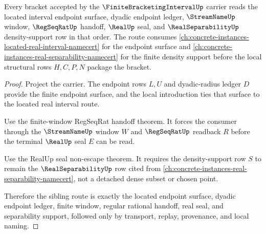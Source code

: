 \begin{theorem}
\label{thm:finite-bracketing-interval-sibling-route}
Every bracket accepted by the $\FiniteBracketingIntervalUp$ carrier reads the located interval endpoint surface, dyadic endpoint ledger, $\StreamNameUp$ window, $\RegSeqRatUp$ handoff, $\RealUp$ seal, and $\RealSeparabilityUp$ density-support row in that order. The route consumes \autoref{ch:concrete-instances-located-real-interval-namecert} for the endpoint surface and \autoref{ch:concrete-instances-real-separability-namecert} for the finite density support before the local structural rows $H,C,P,N$ package the bracket.
\end{theorem}
\begin{proof}
Project the carrier. The endpoint rows $L,U$ and dyadic-radius ledger $D$ provide the finite endpoint surface, and the local introduction ties that surface to the located real interval route.

Use the finite-window RegSeqRat handoff theorem. It forces the consumer through the $\StreamNameUp$ window $W$ and $\RegSeqRatUp$ readback $R$ before the terminal $\RealUp$ seal $E$ can be read.

Use the RealUp seal non-escape theorem. It requires the density-support row $S$ to remain the $\RealSeparabilityUp$ row cited from \autoref{ch:concrete-instances-real-separability-namecert}, not a detached dense subset or chosen point.

Therefore the sibling route is exactly the located endpoint surface, dyadic endpoint ledger, finite window, regular rational handoff, real seal, and separability support, followed only by transport, replay, provenance, and local naming.
\end{proof}


